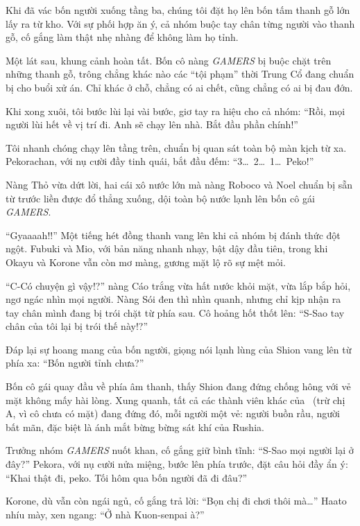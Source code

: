 \documentclass[../main.tex]{subfiles}
\begin{document}
Khi đã vác bốn người xuống tầng ba, chúng tôi đặt họ lên bốn tấm thanh gỗ lớn lấy ra từ kho. Với sự phối hợp ăn ý, cả nhóm buộc tay chân từng người vào thanh gỗ, cố gắng làm thật nhẹ nhàng để không làm họ tỉnh.

Một lát sau, khung cảnh hoàn tất. Bốn cô nàng \textit{GAMERS} bị buộc chặt trên những thanh gỗ, trông chẳng khác nào các ``tội phạm'' thời Trung Cổ đang chuẩn bị cho buổi xử án. Chỉ khác ở chỗ, chẳng có ai chết, cũng chẳng có ai bị đau đớn.

Khi xong xuôi, tôi bước lùi lại vài bước, giơ tay ra hiệu cho cả nhóm: ``Rồi, mọi người lùi hết về vị trí đi. Anh sẽ chạy lên nhà. Bắt đầu phần chính!''

Tôi nhanh chóng chạy lên tầng trên, chuẩn bị quan sát toàn bộ màn kịch từ xa. Pekorachan, với nụ cười đầy tinh quái, bắt đầu đếm: ``3\dots\ 2\dots\ 1\dots\ Peko!''

\pov{-}

Nàng Thỏ vừa dứt lời, hai cái xô nước lớn mà nàng Roboco và Noel chuẩn bị sẵn từ trước liền được đổ thẳng xuống, dội toàn bộ nước lạnh lên bốn cô gái \textit{GAMERS}.

``Gyaaaah!!'' Một tiếng hét đồng thanh vang lên khi cả nhóm bị đánh thức đột ngột. Fubuki và Mio, với bản năng nhanh nhạy, bật dậy đầu tiên, trong khi Okayu và Korone vẫn còn mơ màng, gương mặt lộ rõ sự mệt mỏi.

``C-Có chuyện gì vậy!?'' nàng Cáo trắng vừa hất nước khỏi mặt, vừa lắp bắp hỏi, ngơ ngác nhìn mọi người. Nàng Sói đen thì nhìn quanh, nhưng chỉ kịp nhận ra tay chân mình đang bị trói chặt từ phía sau. Cô hoảng hốt thốt lên: ``S-Sao tay chân của tôi lại bị trói thế này!?''

Đáp lại sự hoang mang của bốn người, giọng nói lạnh lùng của Shion vang lên từ phía xa: ``Bốn người tỉnh chưa?''

Bốn cô gái quay đầu về phía âm thanh, thấy Shion đang đứng chống hông với vẻ mặt không mấy hài lòng. Xung quanh, tất cả các thành viên khác của \hll\ (trừ chị A, vì cô chưa có mặt) đang đứng đó, mỗi người một vẻ: người buồn rầu, người bất mãn, đặc biệt là ánh mắt bừng bừng sát khí của Rushia.

Trưởng nhóm \textit{GAMERS} nuốt khan, cố gắng giữ bình tĩnh: ``S-Sao mọi người lại ở đây?'' Pekora, với nụ cười nửa miệng, bước lên phía trước, đặt câu hỏi đầy ẩn ý: ``Khai thật đi, peko. Tối hôm qua bốn người đã đi đâu?''

Korone, dù vẫn còn ngái ngủ, cố gắng trả lời: ``Bọn chị đi chơi thôi mà\dots'' Haato nhíu mày, xen ngang: ``Ở nhà Kuon-senpai à?''
\end{document}
